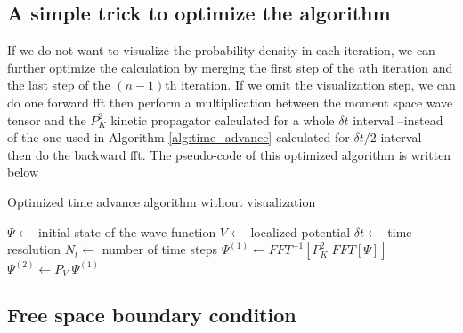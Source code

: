 \subsection{A simple trick to optimize the algorithm}

If we do not want to visualize the probability density in each iteration, we can further optimize the calculation by merging the first step of the $n$th iteration and the last step of the $(n-1)$th iteration.
If we omit the visualization step, we can do one forward \acrshort{fft} then perform a multiplication between the moment space wave tensor and the $P_K^2$ kinetic propagator calculated for a whole $\delta t$ interval --instead of the one used in Algorithm \ref{alg:time_advance} calculated for $\delta t / 2$ interval-- then do the backward \acrshort{fft}.
The pseudo-code of this optimized algorithm is written below
\begin{algorithm}
	\caption{Optimized time advance algorithm without visualization}\label{alg:time_advance_optimized}
	\begin{algorithmic}
		\State $ \Psi \gets $ initial state of the wave function
		\State $ V \gets $ localized potential
		\State $ \delta t \gets $ time resolution
		\State $ N_t \gets $ number of time steps
		\For{$i \in [0, N_t)$}
		\State $\Psi^{(1)} \gets FFT^{-1}
		\left[
		P_K^2\; FFT\left[ \Psi \right]
		\right]
		$
		\State $\Psi^{(2)} \gets P_V\; \Psi^{(1)}$		
		\EndFor
	\end{algorithmic}
\end{algorithm}

\subsection{Free space boundary condition}

